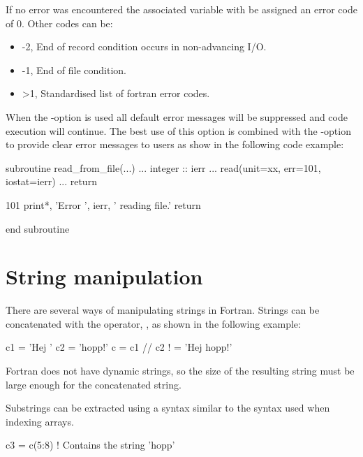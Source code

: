 If no error was encountered the associated variable with be assigned an error code of 0. Other codes can be:

\begin{itemize}
\item -2, End of record condition occurs in non-advancing I/O.
\item -1, End of file condition.
\item >1, Standardised list of fortran error codes.
\end{itemize}


When the -option is used all default error messages will be suppressed and code execution will continue. The best use of this option is combined with the -option to provide clear error messages to users as show in the following code example:

\begin{fortrancodeenv}
subroutine read_from_file(...)
    ...
    integer :: ierr
    ...
    read(unit=xx, err=101, iostat=ierr)
    ...
    return

101 print*, 'Error ', ierr, ' reading file.'
    return

end subroutine
\end{fortrancodeenv}

\section{String manipulation}

There are several ways of manipulating strings in Fortran. Strings can be concatenated with the operator, \foper{//}, as shown in the following example:

\begin{fortrancodeenv}
c1 = 'Hej '
c2 = 'hopp!'
c = c1 // c2 ! = 'Hej hopp!'
\end{fortrancodeenv}

Fortran does not have dynamic strings, so the size of the resulting string must be large enough for the concatenated string.

Substrings can be extracted using a syntax similar to the syntax used when indexing arrays.

\begin{fortrancodeenv}
c3 = c(5:8) ! Contains the string 'hopp'
\end{fortrancodeenv}

